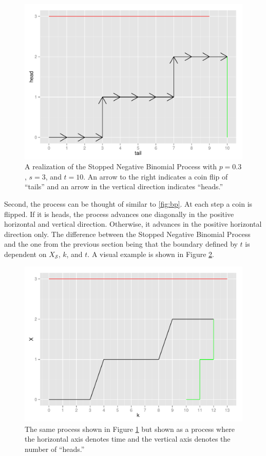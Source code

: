 \documentclass{article}
\newcommand{\Xs}{X_\mathcal{S}}
\begin{document}
\begin{figure}[ht]
\includegraphics[width=\textwidth]{ZeltermanPlot.pdf}
\caption{
A realization of the Stopped Negative Binomial Process with $p=0.3$, $s=3$, 
and $t=10$. An arrow to the right indicates a coin flip of ``tails'' and
an arrow in the vertical direction indicates ``heads.''
}
\label{fig:zelterman_viz}
\end{figure}

Second, the process can be thought of similar to \ref{fig:bp}. At each
step a coin is flipped. If it is heads, the process advances one diagonally
in the positive horizontal and vertical direction. Otherwise, it advances
in the positive horizontal direction only. The difference between the Stopped
Negative Binomial Process and the one from the previous section being that
the boundary defined by $t$ is dependent on $\Xs$, $k$, and $t$. A visual
example is shown in Figure \ref{fig:kane_viz}.

\begin{figure}[ht]
\includegraphics[width=\textwidth]{KanePlot.pdf}
\caption{
The same process shown in Figure \ref{fig:zelterman_viz} but shown as
a process where the horizontal axis denotes time and the vertical axis
denotes the number of ``heads.'' 
}
\label{fig:kane_viz}
\end{figure}
\end{document}
